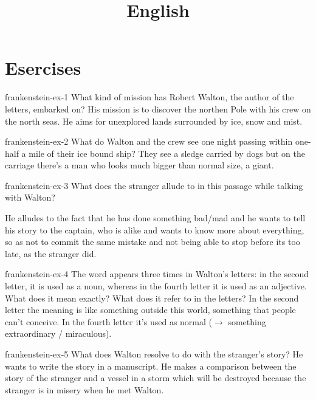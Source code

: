 \documentclass[preview]{standalone}
\begin{document}
\title{English}
\genpage

\section{Esercises}

\begin{snippetexercise}{frankenstein-ex-1}
    {What kind of mission has Robert Walton, the author of the letters, embarked on?}
    His mission is to discover the northen Pole with his crew on the north seas.
    He aims for unexplored lands surrounded by ice, snow and mist.
\end{snippetexercise}

\begin{snippetexercise}{frankenstein-ex-2}
    {What do Walton and the crew see one night passing within one-half a mile of their ice bound
    ship?}
    They see a sledge carried by dogs but on the carriage there's a man who
    looks much bigger than normal size, a giant.
\end{snippetexercise}

\begin{snippetexercise}{frankenstein-ex-3}
    {What does the stranger allude to in this passage while talking with Walton?}
    \begin{center}
    \end{center}
    He alludes to the fact that he has done something bad/mad and he wants to tell
    his story to the captain, who is alike and wants to know more about
    everything, so as not to commit the same mistake and not being able to
    stop before its too late, as the stranger did.
\end{snippetexercise}

\begin{snippetexercise}{frankenstein-ex-4}
    {The word  appears three times in Walton's letters: in the second letter, it is used as
    a noun, whereas in the fourth letter it is used as an adjective. What does it mean exactly? What
    does it refer to in the letters?}
    In the second letter the meaning is like something outside this world, something
    that people can't conceive. In the fourth letter it's used as normal
    (\(\rightarrow\) something extraordinary / miraculous).
\end{snippetexercise}

\begin{snippetexercise}{frankenstein-ex-5}
    {What does Walton resolve to do with the stranger's story?}
    He wants to write the story in a manuscript. He makes a comparison between the
    story of the stranger and a vessel in a storm which will be destroyed because
    the stranger is in misery when he met Walton.
\end{snippetexercise}
\end{document}
